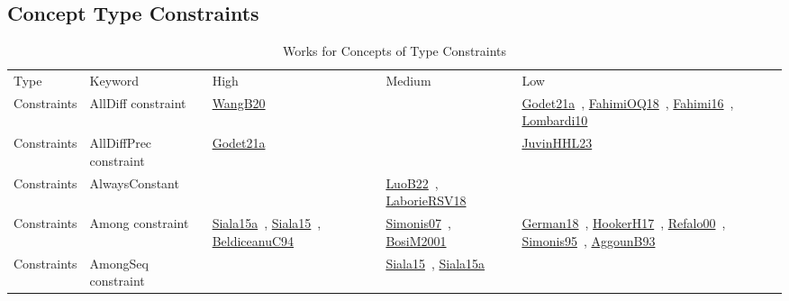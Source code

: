\clearpage
\subsection{Concept Type Constraints}
\label{sec:Constraints}
{\scriptsize
\begin{longtable}{lp{3cm}>{\raggedright\arraybackslash}p{6cm}>{\raggedright\arraybackslash}p{6cm}>{\raggedright\arraybackslash}p{8cm}}
\rowcolor{white}\caption{Works for Concepts of Type Constraints}\\ \toprule
\rowcolor{white}Type & Keyword & High & Medium & Low\\ \midrule\endhead
\bottomrule
\endfoot
Constraints & AllDiff constraint & \href{../works/WangB20.pdf}{WangB20}~\cite{WangB20} &  & \href{../works/Godet21a.pdf}{Godet21a}~\cite{Godet21a}, \href{../works/FahimiOQ18.pdf}{FahimiOQ18}~\cite{FahimiOQ18}, \href{../works/Fahimi16.pdf}{Fahimi16}~\cite{Fahimi16}, \href{../works/Lombardi10.pdf}{Lombardi10}~\cite{Lombardi10}\\
Constraints & AllDiffPrec constraint & \href{../works/Godet21a.pdf}{Godet21a}~\cite{Godet21a} &  & \href{../works/JuvinHHL23.pdf}{JuvinHHL23}~\cite{JuvinHHL23}\\
Constraints & AlwaysConstant &  & \href{../works/LuoB22.pdf}{LuoB22}~\cite{LuoB22}, \href{../works/LaborieRSV18.pdf}{LaborieRSV18}~\cite{LaborieRSV18} & \\
Constraints & Among constraint & \href{../works/Siala15a.pdf}{Siala15a}~\cite{Siala15a}, \href{../works/Siala15.pdf}{Siala15}~\cite{Siala15}, \href{../works/BeldiceanuC94.pdf}{BeldiceanuC94}~\cite{BeldiceanuC94} & \href{../works/Simonis07.pdf}{Simonis07}~\cite{Simonis07}, \href{../works/BosiM2001.pdf}{BosiM2001}~\cite{BosiM2001} & \href{../works/German18.pdf}{German18}~\cite{German18}, \href{../works/HookerH17.pdf}{HookerH17}~\cite{HookerH17}, \href{../works/Refalo00.pdf}{Refalo00}~\cite{Refalo00}, \href{../works/Simonis95.pdf}{Simonis95}~\cite{Simonis95}, \href{../works/AggounB93.pdf}{AggounB93}~\cite{AggounB93}\\
Constraints & AmongSeq constraint &  & \href{../works/Siala15.pdf}{Siala15}~\cite{Siala15}, \href{../works/Siala15a.pdf}{Siala15a}~\cite{Siala15a} & \\

\end{longtable}}
